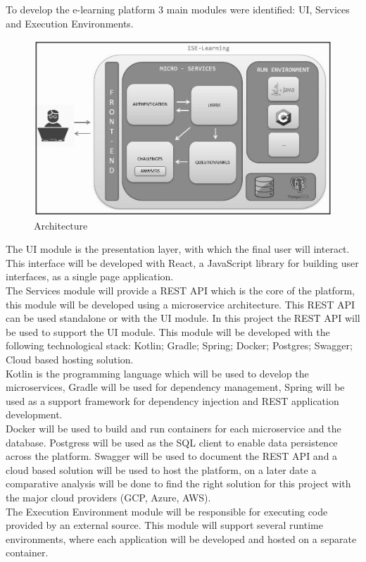 To develop the e-learning platform 3 main modules were identified: UI, Services and Execution Environments.
\\
\begin{center}
	\begin{figure}[H]
  		\includegraphics[scale=0.4]{./imgs/arquitectura.JPG}
  		\caption{Architecture}
  		\label{fig:architecture}
	\end{figure}
\end{center}


The UI module is the presentation layer, with which the final user will interact. This interface will be developed with React, a JavaScript library for building user interfaces, as a single page application.
\\
 
The Services module will provide a REST API which is the core of the platform, this module will be developed using a microservice architecture. This REST API can be used standalone or with the UI module. In this project the REST API will be used to support the UI module. This module will be developed with the following technological stack: Kotlin; Gradle; Spring; Docker; Postgres; Swagger; Cloud based hosting solution.
\\
Kotlin is the programming language which will be used to develop the microservices, Gradle will be used for dependency management, Spring will be used as a support framework for dependency injection and REST application development.
\\
Docker will be used to build and run containers for each microservice and the database. Postgress will be used as the SQL client to enable data persistence across the platform. Swagger will be used to document the REST API and a cloud based solution will be used to host the platform, on a later date a comparative analysis will be done to find the right solution for this project with the major cloud providers (GCP, Azure, AWS).
\\
 
The Execution Environment module will be responsible for executing code provided by an external source. This module will support several runtime environments, where each application will be developed and hosted on a separate container.
\\